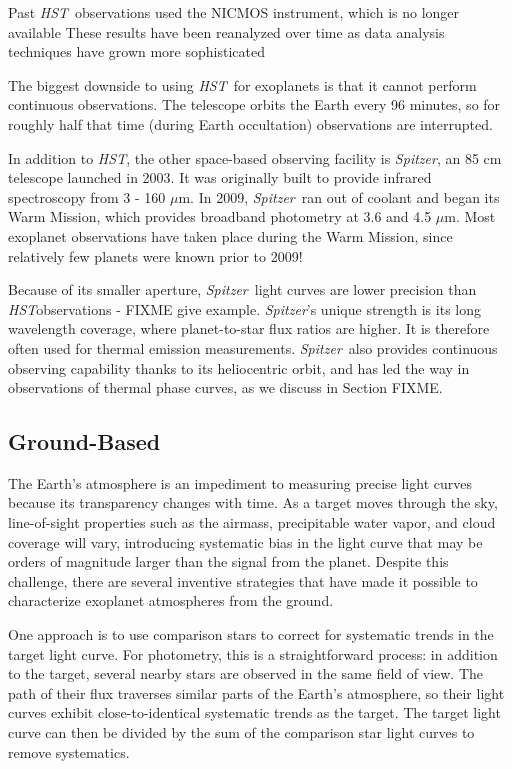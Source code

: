 \documentclass[graybox,natbib,nosecnum]{svmult}
\newcommand{\project}[1]{\textsl{#1}}
\newcommand{\HST}{\project{HST}}
\newcommand{\Spitzer}{\project{Spitzer}}
\begin{document}
Past \HST\ observations used the NICMOS instrument, which is no longer available 
These results \citep{tinetti07, swain08} have been reanalyzed over time as data analysis techniques have grown more sophisticated \citep{gibson11}

The biggest downside to using \HST\ for exoplanets is that it cannot perform continuous observations. The telescope orbits the Earth every 96 minutes, so for roughly half that time (during Earth occultation) observations are interrupted. 

In addition to \HST, the other space-based observing facility is \Spitzer, an 85 cm telescope launched in 2003. It was originally built to provide infrared spectroscopy from 3 - 160 $\mu$m.  In 2009, \Spitzer\ ran out of coolant and began its Warm Mission, which provides broadband photometry at 3.6 and 4.5 $\mu$m.  Most exoplanet observations have taken place during the Warm Mission, since relatively few planets were known prior to 2009!

Because of its smaller aperture, \Spitzer\ light curves are lower precision than \HST observations - FIXME give example. \Spitzer's unique strength is its long wavelength coverage, where planet-to-star flux ratios are higher. It is therefore often used for thermal emission measurements. \Spitzer\ also provides continuous observing capability thanks to its heliocentric orbit, and has led the way in observations of thermal phase curves, as we discuss in Section FIXME. 


\subsection{Ground-Based}
The Earth's atmosphere is an impediment to measuring precise light curves because its transparency changes with time.  As a target moves through the sky, line-of-sight properties such as the airmass, precipitable water vapor, and cloud coverage will vary, introducing systematic bias in the light curve that may be orders of magnitude larger than the signal from the planet. Despite this challenge, there are several inventive strategies that have made it possible to characterize exoplanet atmospheres from the ground. 

One approach is to use comparison stars to correct for systematic trends in the target light curve. For photometry, this is a straightforward process: in addition to the target, several nearby stars are observed in the same field of view. The path of their flux traverses similar parts of the Earth's atmosphere, so their light curves exhibit close-to-identical systematic trends as the target. The target light curve can then be divided by the sum of the comparison star light curves to remove systematics. 
\end{document}
